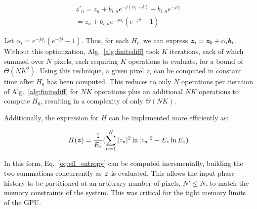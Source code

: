 \begin{equation}\label{eq:z_prime}
  \begin{split}
    z'_n = z_n + b_{i,n}e^{-j(\phi_{i} + \delta)} - b_{i,n}e^{-j\phi_{i}} \\ =
    z_n + b_{i,n}e^{-j\phi_{i}}(e^{-j\delta} - 1)
  \end{split}
\end{equation}

Let $\alpha_{i} = e^{-j\phi_{i}}(e^{-j\delta} - 1)$. Thus, for each $H_i$, we
can express $\bm{z}_{i} = \bm{z}_{0} + \alpha_{i} \bm{b}_i$. Without this
optimization, Alg.~\ref{alg:finitediff} took $K$ iterations, each of which
summed over $N$ pixels, each requiring $K$ operations to evaluate, for a bound
of $\Theta(NK^2)$. Using this technique, a given pixel $z_i$ can be computed in
constant time after $H_0$ has been computed. This reduces to only $N$ operations
per iteration of Alg.~\ref{alg:finitediff} for $NK$ operations plus an
additional $NK$ operations to compute $H_0$, resulting in a complexity of only
$\Theta(NK)$.

Additionally, the expression for $H$ can be implemented more efficiently as:

\begin{equation}\label{eq:eff_entropy}
  H(\bm{z}) = \frac{1}{E_z}(\sum_{n=1}^{N} |z_n|^2 \ln |z_n|^2 - E_z \ln E_z)
\end{equation}

In this form, Eq.~\ref{eq:eff_entropy} can be computed incrementally, building the
two summations concurrently as $\bm{z}$ is evaluated. This allows the input phase
history to be partitioned at an arbitrary number of pixels, $N' \le N$, to match
the memory constraints of the system. This was critical for the tight memory
limits of the GPU.
